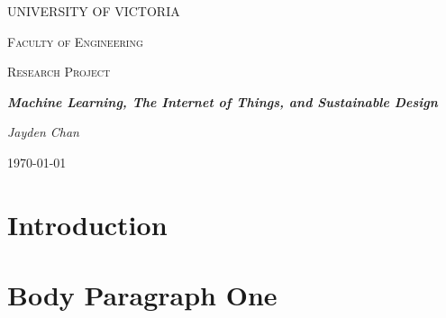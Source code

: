 \documentclass[a4paper]{article}
\begin{document}
\begin{titlepage}
    \centering
    {\scshape\huge UNIVERSITY OF VICTORIA \par}
    \vspace{1cm}
    {\scshape\LARGE Faculty of Engineering \par}
    \vspace{1cm}
    {\scshape\Large Research Project \par}
    \vspace{1.5cm}
    {\huge\bfseries \emph{Machine Learning, The Internet of Things, and Sustainable Design} \par}
    \vspace{2cm}
    {\Large\itshape Jayden Chan \par}
    \vfill
    {\large \today\par}
\end{titlepage}
\section{Introduction}
\blindtext
\section{Body Paragraph One}
\blindtext
\blindtext
\blindtext
\end{document}
